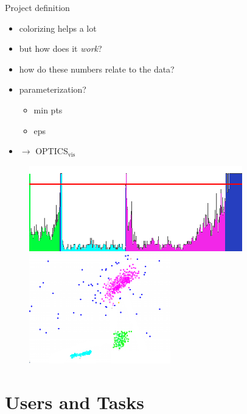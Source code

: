 \documentclass[naustrian]{beamer}
\begin{document}
\begin{frame}{Project definition}
    \begin{itemize}
        \item colorizing helps a lot
        \item but how does it \emph{work}?
        \item how do these numbers relate to the data?
        \item parameterization?
            \begin{itemize}
                \item min pts
                \item eps
            \end{itemize}
        \item[] $\rightarrow$ OPTICS$_\text{vis}$
    \end{itemize}
    \begin{figure}[h]
        \centering
        \includegraphics[height=.3\textheight]{img/optics-edited-color}
        \vspace{1em}
        \includegraphics[width=.3\textwidth]{img/optics-edited-points}
    \end{figure}
\end{frame}

\section{Users and Tasks}
\end{document}
